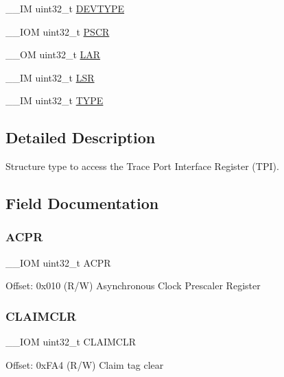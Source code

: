 \begin{DoxyCompactItemize}
\item 
\+\_\+\+\_\+\+IM uint32\+\_\+t \mbox{\hyperlink{struct_t_p_i___type_a81f643aff0e4bed2638a618e2b1fd3bb}{D\+E\+V\+T\+Y\+PE}}
\item 
\+\_\+\+\_\+\+I\+OM uint32\+\_\+t \mbox{\hyperlink{struct_t_p_i___type_a3fbc5c84a2a24bd6195e970ff8898024}{P\+S\+CR}}
\item 
\+\_\+\+\_\+\+OM uint32\+\_\+t \mbox{\hyperlink{struct_t_p_i___type_acc9e51f871c357a9094105435b150d13}{L\+AR}}
\item 
\+\_\+\+\_\+\+IM uint32\+\_\+t \mbox{\hyperlink{struct_t_p_i___type_a7219432d03f6cd1d220f4fe10aef4880}{L\+SR}}
\item 
\+\_\+\+\_\+\+IM uint32\+\_\+t \mbox{\hyperlink{struct_t_p_i___type_aee6e8f4171b9024d763ba87f3ce92e73}{T\+Y\+PE}}
\end{DoxyCompactItemize}


\subsection{Detailed Description}
Structure type to access the Trace Port Interface Register (T\+PI). 

\subsection{Field Documentation}
\mbox{\label{struct_t_p_i___type_a49a770cf0b7ec970f919f8ac22634fff}} 
\subsubsection{\texorpdfstring{ACPR}{ACPR}}
{\footnotesize\ttfamily \+\_\+\+\_\+\+I\+OM uint32\+\_\+t A\+C\+PR}

Offset\+: 0x010 (R/W) Asynchronous Clock Prescaler Register \mbox{\label{struct_t_p_i___type_a1f74caab7b0a7afa848c63ce8ebc6a6f}} 
\subsubsection{\texorpdfstring{CLAIMCLR}{CLAIMCLR}}
{\footnotesize\ttfamily \+\_\+\+\_\+\+I\+OM uint32\+\_\+t C\+L\+A\+I\+M\+C\+LR}

Offset\+: 0x\+F\+A4 (R/W) Claim tag clear \mbox{\label{struct_t_p_i___type_a974d17c9a0b0b1b894e9707d158b0fbe}} 
